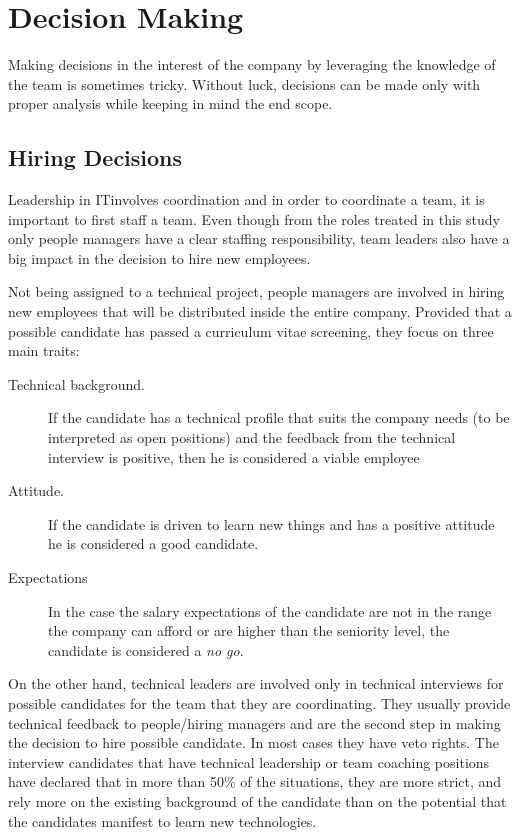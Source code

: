 \chapter{Decision Making}
\label{chapter:decision}
Making decisions in the interest of the company by leveraging the knowledge of the team is sometimes tricky. Without luck, decisions can be made only with proper analysis while keeping in mind the end scope.
\section{Hiring Decisions}
\label{sec:hiring}
Leadership in ITinvolves coordination and in order to coordinate a team, it is important to first staff a team. Even though from the roles treated in this study only people managers have a clear staffing responsibility, team leaders also have a big impact in the decision to hire new employees. 

Not being assigned to a technical project, people managers are involved in hiring new employees that will be distributed inside the entire company. Provided that a possible candidate has passed a curriculum vitae screening, they focus on three main traits:

\begin{description}
\item [Technical background.] If the candidate has a technical profile that suits the company needs (to be interpreted as open positions) and the feedback from the technical interview is positive, then he is considered a viable employee
\item [Attitude.] If the candidate is driven to learn new things and has a positive attitude he is considered a good candidate.
\item [Expectations] In the case the salary expectations of the candidate are not in the range the company can afford or are higher than the seniority level, the candidate is considered a \textit{no go}.
\end{description}

On the other hand, technical leaders are involved only in technical interviews for possible candidates for the team that they are coordinating. They usually provide technical feedback to people/hiring managers and are the second step in making the decision to hire possible candidate. In most cases they have veto rights. The interview candidates that have technical leadership or team coaching positions have declared that in more than 50\% of the situations, they are more strict, and rely more on the existing background of the candidate than on the potential that the candidates manifest to learn new technologies.

